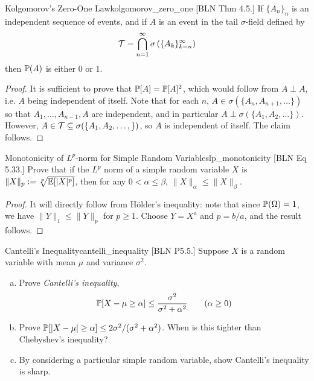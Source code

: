 \begin{problem}{Kolgomorov's Zero-One Law}{kolgomorov_zero_one}
    [BLN Thm 4.5.] If \(\{A_n\}_n\) is an independent sequence of events, and if \(A\) is an event in the tail \(\sigma\)-field defined by
    \[
        \mathcal{T} = \bigcap_{n=1}^\infty \sigma \left( \{A_k\}_{k=n}^\infty \right)
    \]
    then \(\mathbb{P}(A)\) is either \(0\) or \(1\).
\end{problem}

\begin{proof}
    It is sufficient to prove that \(\mathbb{P}[A] = \mathbb{P}[A]^2\), which would follow from \(A \perp A\), i.e. \(A\) being independent of itself. Note that for each \(n\), \(A \in \sigma(\{A_n, A_{n+1}, \dots\})\) so that \(A_1, \dots, A_{n-1}, A\) are independent, and in particular \(A \perp \sigma(\{A_1, A_2, \dots \})\). However, \(A \in \mathcal{T} \subseteq \sigma(\{A_1, A_2, \dots, \})\), so \(A\) is independent of itself. The claim follows. 
\end{proof}


\begin{problem}{Monotonicity of \(L^p\)-norm for Simple Random Variables}{lp_monotonicity}
    [BLN Eq 5.33.] Prove that if the \(L^p\) norm of a simple random variable \(X\) is \(\|X\|_p := \sqrt[p]{\mathbb{E}[|X|^p]}\), then for any \(0 < \alpha \leq \beta\), \(\|X\|_\alpha \leq \|X\|_\beta\).
\end{problem}


\begin{proof}
    It will directly follow from H\"older's inequality: note that since \(\mathbb{P}(\Omega) = 1\), we have \(\|Y\|_1 \leq \|Y\|_p\) for \(p \geq 1\). Choose \(Y = X^a\) and \(p = b/a\), and the result follows.
\end{proof}


\begin{problem}{Cantelli's Inequality}{cantelli_inequality}
    [BLN P5.5.] Suppose \(X\) is a random variable with mean \(\mu\) and variance \(\sigma^2\).
    \begin{enumerate}[(a)]
        \itemsep0em
        \item Prove \textit{Cantelli's inequality},
        \[
            \mathbb{P}[X - \mu \geq \alpha] \leq \frac{\sigma^2}{\sigma^2 + \alpha^2}
            \qquad (\alpha \geq 0)
        \]
        \item Prove \(\mathbb{P}[|X - \mu| \geq \alpha] \leq 2\sigma^2 / (\sigma^2 + \alpha^2)\). When is this tighter than Chebyshev's inequality?
        \item By considering a particular simple random variable, show Cantelli's inequality is sharp.
    \end{enumerate}
\end{problem}

